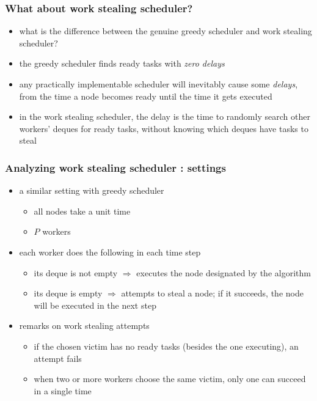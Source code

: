 \documentclass[12pt,dvipdfmx]{beamer}
\newcommand{\ao}[1]{{\color{blue}#1}}
\newcommand{\aka}[1]{{\color{red}#1}}
\begin{document}
\begin{frame}
\frametitle{What about work stealing scheduler?}
\begin{itemize}

\item<1-> what is the difference between the genuine
  greedy scheduler and work stealing scheduler?
\item the greedy scheduler finds ready tasks 
  with \aka{\it zero delays}

\item<2-> any practically implementable scheduler will
  inevitably cause some \aka{\it delays}, from the
  time a node becomes ready until the time it gets
  executed

\item<3-> in the work stealing scheduler, the delay is
  the time to randomly search other workers'
  deques for ready tasks, without knowing which 
  deques have tasks to steal
\end{itemize}
\end{frame}

\begin{frame}
\frametitle{Analyzing work stealing scheduler : settings}
\begin{itemize}
\item<1-> a similar setting with greedy scheduler
  \begin{itemize}
  \item all nodes take a unit time
  \item $P$ workers
  \end{itemize}

\item<2-> \ao{each worker does the following in each time step}
  \begin{itemize}

  \item its deque is not empty $\Rightarrow$ 
    executes the node designated by the algorithm

  \item its deque is empty  $\Rightarrow$ 
    attempts to steal a node; 
    if it succeeds, the node will be
    executed in the next step
  \end{itemize}

\item<3-> remarks on work stealing attempts
  \begin{itemize}
  \item if the chosen victim has no ready tasks 
    (besides the one executing), an attempt fails
  \item when two or more workers choose the same victim, 
    only one can succeed in a single time 
  \end{itemize}
\end{itemize}
\end{frame}
\end{document}
